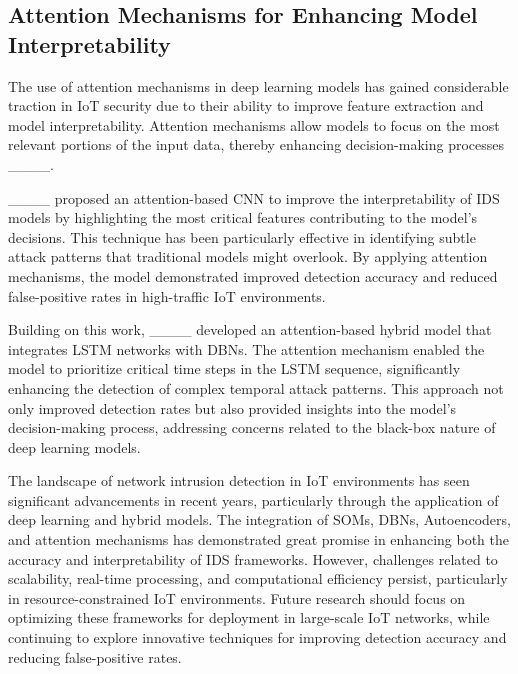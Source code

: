 \subsection{Attention Mechanisms for Enhancing Model Interpretability}

The use of attention mechanisms in deep learning models has gained considerable traction in IoT security due to their ability to improve feature extraction and model interpretability. Attention mechanisms allow models to focus on the most relevant portions of the input data, thereby enhancing decision-making processes ____.

____ proposed an attention-based CNN to improve the interpretability of IDS models by highlighting the most critical features contributing to the model's decisions. This technique has been particularly effective in identifying subtle attack patterns that traditional models might overlook. By applying attention mechanisms, the model demonstrated improved detection accuracy and reduced false-positive rates in high-traffic IoT environments.

Building on this work, ____ developed an attention-based hybrid model that integrates LSTM networks with DBNs. The attention mechanism enabled the model to prioritize critical time steps in the LSTM sequence, significantly enhancing the detection of complex temporal attack patterns. This approach not only improved detection rates but also provided insights into the model's decision-making process, addressing concerns related to the black-box nature of deep learning models.

The landscape of network intrusion detection in IoT environments has seen significant advancements in recent years, particularly through the application of deep learning and hybrid models. The integration of SOMs, DBNs, Autoencoders, and attention mechanisms has demonstrated great promise in enhancing both the accuracy and interpretability of IDS frameworks. However, challenges related to scalability, real-time processing, and computational efficiency persist, particularly in resource-constrained IoT environments. Future research should focus on optimizing these frameworks for deployment in large-scale IoT networks, while continuing to explore innovative techniques for improving detection accuracy and reducing false-positive rates.


